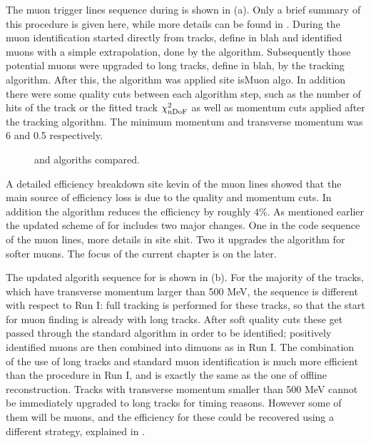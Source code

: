 The \hltone muon trigger lines sequence during \runone is shown in (a).
Only a brief summary of this procedure is given here,  while more details can be found in \cite{LHCb-PUB-2011-017}.
During \runone the muon identification started directly from \velo tracks,{\color{red} define in blah}
and identified muons with a simple extrapolation, done by the \mvm algorithm\cite{LHCb-PUB-2011-017}.
Subsequently those potential muons were upgraded to long tracks, {\color{red} define in blah}, by the
\FwD tracking algorithm. After this, the  algorithm was applied {\color{red} site isMuon algo}.
In addition there were some quality cuts between each algorithm step, such as the number of \velo hits
of the track or the fitted track $\chi^2_{\text {nDoF}}$ as well as momentum cuts applied after the \FwD
tracking algorithm. The minimum momentum and transverse momentum was 6 \gevc and 0.5 \gevc respectively.

\begin{figure}[h!]
  \centering
  \scalebox{1}{}
  \scalebox{1}{}
 \caption{ \runone and \runtwo \hltone algoriths compared. }
  \label{hlt1_algo_seq}
\end{figure}

A detailed efficiency breakdown{\color{red} site kevin} of the \runone \hltone muon lines showed that the main source of efficiency
loss is due to the quality and momentum cuts. In addition the \mvm algorithm reduces the efficiency by roughly $4\%$.
As mentioned earlier the updated scheme of \hltone for \runtwo includes two major changes. One in the code sequence of the
\hltone muon lines, more details in {\color{red} site shit}. Two it upgrades the \mvm algorithm for softer muons. The focus of the current chapter is on the later.

The updated \hltone algorith sequence for \runtwo is shown in (b).
For the majority of the tracks, which have transverse momentum larger than 500 MeV, the sequence is different with respect to
Run I: full tracking is performed for these tracks, so that the start for muon finding is already with long tracks.
After soft quality cuts these get passed through the standard  algorithm in order to be identified;
positively identified muons are then combined into dimuons as in Run I.
The combination of the use of long tracks and standard muon identification is much more efficient than the
procedure in Run I, and is exactly the same as the one of offline reconstruction.
Tracks with transverse momentum smaller than 500 MeV cannot be immediately upgraded to long tracks for timing reasons.
However some of them will be muons, and the efficiency for these could be recovered using a different strategy,
explained in .
